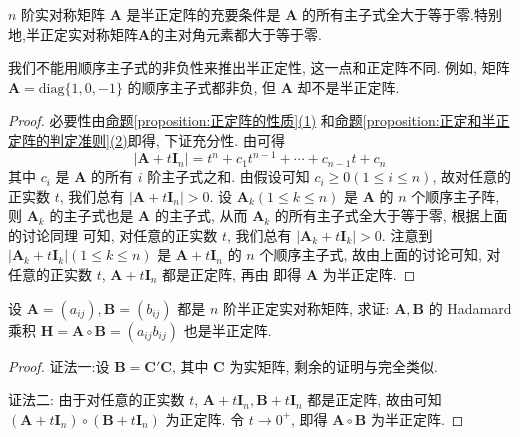 \documentclass[../../main.tex]{subfiles}%
\begin{document}
\begin{proposition}\label{proposition:半正定阵关于顺序主子式的性质}
\(n\) 阶实对称矩阵 \(\boldsymbol{A}\) 是半正定阵的充要条件是 \(\boldsymbol{A}\) 的所有主子式全大于等于零.特别地,半正定实对称矩阵$\boldsymbol{A}$的主对角元素都大于等于零.
\end{proposition}
\begin{remark}
我们不能用顺序主子式的非负性来推出半正定性, 这一点和正定阵不同. 例如, 矩阵 \(\boldsymbol{A}=\text{diag}\{1,0,-1\}\) 的顺序主子式都非负, 但 \(\boldsymbol{A}\) 却不是半正定阵. 
\end{remark}
\begin{proof}
必要性由\hyperref[proposition:正定阵的性质]{命题\ref{proposition:正定阵的性质}(1)} 和\hyperref[proposition:正定和半正定阵的判定准则]{命题\ref{proposition:正定和半正定阵的判定准则}(2)}即得, 下证充分性. 由可得
\[|\boldsymbol{A}+t\boldsymbol{I}_n|=t^n + c_1t^{n - 1}+\cdots + c_{n - 1}t + c_n\]
其中 \(c_i\) 是 \(\boldsymbol{A}\) 的所有 \(i\) 阶主子式之和. 由假设可知 \(c_i\geqslant 0(1\leqslant  i\leqslant  n)\), 故对任意的正实数 \(t\), 我们总有 \(|\boldsymbol{A}+t\boldsymbol{I}_n|>0\). 设 \(\boldsymbol{A}_k(1\leqslant  k\leqslant  n)\) 是 \(\boldsymbol{A}\) 的 \(n\) 个顺序主子阵, 则 \(\boldsymbol{A}_k\) 的主子式也是 \(\boldsymbol{A}\) 的主子式, 从而 \(\boldsymbol{A}_k\) 的所有主子式全大于等于零, 根据上面的讨论同理 可知, 对任意的正实数 \(t\), 我们总有 \(|\boldsymbol{A}_k + t\boldsymbol{I}_k|>0\). 注意到 \(|\boldsymbol{A}_k + t\boldsymbol{I}_k|(1\leqslant  k\leqslant  n)\) 是 \(\boldsymbol{A}+t\boldsymbol{I}_n\) 的 \(n\) 个顺序主子式, 故由上面的讨论可知, 对任意的正实数 \(t\), \(\boldsymbol{A}+t\boldsymbol{I}_n\) 都是正定阵, 再由 即得 \(\boldsymbol{A}\) 为半正定阵. 
\end{proof}

\begin{proposition}\label{proposition:半正定阵的Hadamard乘积性质}
设 \(\boldsymbol{A}=(a_{ij}),\boldsymbol{B}=(b_{ij})\) 都是 \(n\) 阶半正定实对称矩阵, 求证: \(\boldsymbol{A},\boldsymbol{B}\) 的 Hadamard 乘积 \(\boldsymbol{H}=\boldsymbol{A}\circ\boldsymbol{B}=(a_{ij}b_{ij})\) 也是半正定阵.
\end{proposition}
\begin{proof}

{\color{blue}证法一:}设 \(\boldsymbol{B}=\boldsymbol{C}'\boldsymbol{C}\), 其中 \(\boldsymbol{C}\) 为实矩阵, 剩余的证明与完全类似.

{\color{blue}证法二:} 由于对任意的正实数 \(t\), \(\boldsymbol{A}+t\boldsymbol{I}_n,\boldsymbol{B}+t\boldsymbol{I}_n\) 都是正定阵, 故由可知 \((\boldsymbol{A}+t\boldsymbol{I}_n)\circ(\boldsymbol{B}+t\boldsymbol{I}_n)\) 为正定阵. 令 \(t\to0^+\), 即得 \(\boldsymbol{A}\circ\boldsymbol{B}\) 为半正定阵.
\end{proof}
\end{document}
